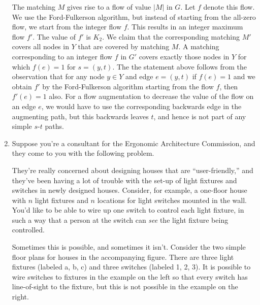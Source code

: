 \documentclass[12pt]{article}
\begin{document}
\begin{enumerate}
{The matching $M$ gives rise to a flow of value $|M|$ in $G$. Let $f$
denote this flow. We use the Ford-Fulkerson algorithm,
but instead of starting from the all-zero flow, we
start from the
integer flow $f$.
This results in an integer maximum flow $f'$. The value
of $f'$ is $K_2$. We claim that the corresponding matching $M'$ covers
all nodes in $Y$ that are covered by matching $M$. A matching corresponding
to
an integer flow $f$ in $G'$ covers exactly those nodes in $Y$ for which
$f(e)=1$ for $s=(y,t)$. The the statement above follows from the observation
that for any node $y \in Y$ and edge $e=(y,t)$ if $f(e)=1$ and we obtain
$f'$ by the Ford-Fulkerson algorithm starting from the flow $f$, then
$f'(e)=1$ also. For a flow augmentation to decrease the value of the flow
on an edge $e$, we would have to use the corresponding backwards edge in the
augmenting path, but this backwards leaves $t$, and hence is not part of
any simple $s$-$t$ paths.
}


\item

Suppose you're a consultant for the
Ergonomic Architecture Commission, and they come
to you with the following problem.

They're really concerned about designing houses
that are ``user-friendly,'' and they've been
having a lot of trouble with the set-up of
light fixtures and switches in newly designed houses.
Consider, for example, a one-floor house with $n$ light fixtures
and $n$ locations for light switches mounted in the wall.
You'd like to be able to wire up one switch to control
each light fixture, in such a way that a person at the
switch can {\em see} the light fixture being controlled.

Sometimes this is possible, and sometimes it isn't.
Consider the two simple floor plans for houses in
the accompanying figure.
There are three light fixtures (labeled a, b, c)
and three switches (labeled 1, 2, 3).
It is possible to wire switches to fixtures in the
example on the left so that every switch has line-of-sight
to the fixture, but this is not possible in the example on
the right.
\begin{figure}[h]
\begin{center}


\end{center}
\end{figure}
\end{enumerate}
\end{document}
